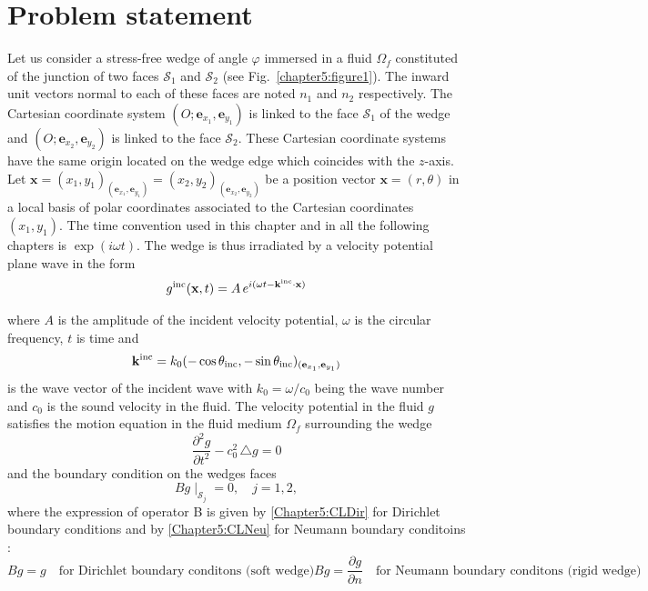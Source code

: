 \section{Problem statement}
\label{Chapter5:problem}

Let us consider a stress-free wedge of angle $\varphi$ immersed in a fluid $\Omega_f$ constituted of the junction of two faces $\mathcal{S}_1$ and $\mathcal{S}_2$ (see Fig.~\ref{chapter5:figure1}). The inward unit vectors normal to each of these faces are noted $n_1$ and $n_2$ respectively. The Cartesian coordinate system $(O; \mathbf{e}_{x_1}, \mathbf{e}_{y_1} )$ is linked to the face $\mathcal{S}_1$ of the wedge and $(O;  \mathbf{e}_{x_2}, \mathbf{e}_{y_2} )$ is linked to the face $\mathcal{S}_2$. These Cartesian coordinate systems  have the same origin located on the wedge edge which coincides with the $z$-axis. Let $\mathbf{x} = (x_1,y_1)_{ (\mathbf{e}_{x_1}, \mathbf{e}_{y_1}) } = (x_2,y_2)_{ (\mathbf{e}_{x_2}, \mathbf{e}_{y_2})}$ be a position vector $\mathbf{x} = (r,\theta)$ in a local basis of polar coordinates associated to the Cartesian coordinates $(x_1,y_1)$. The time convention used in this chapter and in all the following chapters is $\exp(i\omega t)$. The wedge is thus irradiated by a velocity potential plane wave in the form
\begin{align}
\label{Chapter5:incidence_wave}
g^{\rm inc}(\mathbf{x},t) = A \, e^{i(\omega t - \mathbf{k}^{\rm inc} \cdot \mathbf{x})}
\end{align}

where $A$ is the amplitude of the incident velocity potential, $\omega$ is the circular frequency, $t$ is time and 
\begin{align}
\mathbf{k}^{\rm inc} = k_0 (-\cos \theta_{\rm inc},-\sin \theta_{\rm inc})_{(\mathbf{e}_{x_1}, \mathbf{e}_{y_1})}
\end{align}
is the wave vector of the incident wave with $k_0 = \omega/c_0$ being the wave number and $c_0$ is the sound velocity in the fluid.  The velocity potential in the fluid $g$ satisfies the motion equation in the fluid medium $\Omega_f$ surrounding the wedge 
\begin{equation}
\label{Chapter5:WaveMotion}
\frac{\partial^2 g}{\partial t^2} - c_0^2 \, \triangle g = 0
\end{equation}
and the boundary condition on the wedges faces
\begin{equation}
\label{Chapter5:CL}
Bg\mid_{\mathcal{S}_j} = 0, \quad j=1,2,
\end{equation}
where the expression of operator B is given by \eqref{Chapter5:CLDir} for Dirichlet boundary conditions and by \eqref{Chapter5:CLNeu} for Neumann boundary conditoins :
\begin{subequations}
\begin{equation}
\label{Chapter5:CLDir}
Bg = g \quad \mbox{for Dirichlet boundary conditons (soft wedge)}
\end{equation}
\begin{equation}
\label{Chapter5:CLNeu}
Bg = \frac{\partial g}{\partial n} \quad \mbox{for Neumann boundary conditons (rigid wedge)}
\end{equation}
\end{subequations}

